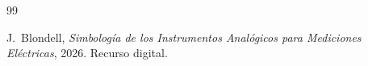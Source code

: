 \documentclass[12pt,a4paper]{article}
\begin{document}


\tableofcontents
\newpage









\begin{thebibliography}{99}

J.~Blondell, \textit{Simbología de los Instrumentos Analógicos para Mediciones Eléctricas}, 2026. Recurso digital.

\end{thebibliography}
\end{document}
